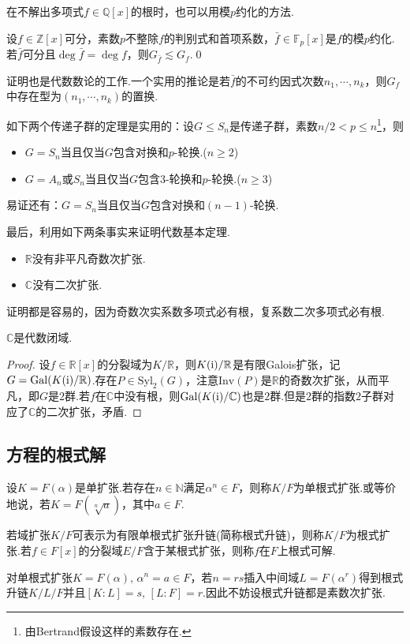 在不解出多项式$f\in\mathbb{Q}[x]$的根时，也可以用模$p$约化的方法.
\begin{thm}[(Dedekind)]
    设$f\in\mathbb{Z}[x]$可分，素数$p$不整除$f$的判别式和首项系数，$\bar f\in\mathbb{F}_p[x]$是$f$的模$p$约化.若$\bar f$可分且$\deg\bar f=\deg f$，则$G_{\bar f}\lesssim G_f$.\qed
\end{thm}
\begin{remark}
    证明也是代数数论的工作.一个实用的推论是若$\bar f$的不可约因式次数$n_1,\cdots,n_k$，则$G_f$中存在型为$(n_1,\cdots,n_k)$的置换.
\end{remark}
\begin{remark}
    如下两个传递子群的定理是实用的：设$G\le S_n$是传递子群，素数$n/2<p\le n$\footnote{由Bertrand假设这样的素数存在.}，则
    \begin{itemize}
        \item $G=S_n$当且仅当$G$包含对换和$p$-轮换.($n\ge 2$)
        \item $G=A_n$或$S_n$当且仅当$G$包含$3$-轮换和$p$-轮换.($n\ge 3$)
    \end{itemize}
    易证还有：$G=S_n$当且仅当$G$包含对换和$(n-1)$-轮换.
\end{remark}

最后，利用如下两条事实来证明代数基本定理.
\begin{itemize}
    \item $\mathbb{R}$没有非平凡奇数次扩张.
    \item $\mathbb{C}$没有二次扩张.
\end{itemize}
证明都是容易的，因为奇数次实系数多项式必有根，复系数二次多项式必有根.
\begin{thm}[(代数基本定理)]
    $\mathbb{C}$是代数闭域.
\end{thm}
\begin{proof}
    设$f\in\mathbb{R}[x]$的分裂域为$K/\mathbb{R}$，则$K(\mathrm{i})/\mathbb{R}$是有限Galois扩张，记$G=\mathrm{Gal}(K(\mathrm{i})/\mathbb{R})$.存在$P\in\mathrm{Syl}_2(G)$，注意$\mathrm{Inv}(P)$是$\mathbb{R}$的奇数次扩张，从而平凡，即$G$是$2$群.若$f$在$\mathbb{C}$中没有根，则$\mathrm{Gal}(K(\mathrm{i})/\mathbb{C})$也是$2$群.但是$2$群的指数$2$子群对应了$\mathbb{C}$的二次扩张，矛盾.
\end{proof}

\subsection{方程的根式解}
\begin{definition}
    设$K=F(\alpha)$是单扩张.若存在$n\in\mathbb{N}$满足$\alpha^n\in F$，则称$K/F$为{\heiti 单根式扩张}.或等价地说，若$K=F(\sqrt[n]{a})$，其中$a\in F$.

    若域扩张$K/F$可表示为有限单根式扩张升链(简称{\heiti 根式升链})，则称$K/F$为{\heiti 根式扩张}.若$f\in F[x]$的分裂域$E/F$含于某根式扩张，则称$f$在$F$上{\heiti 根式可解}.
\end{definition}
\begin{remark}
    对单根式扩张$K=F(\alpha),\,\alpha^n=a\in F$，若$n=rs$插入中间域$L=F(\alpha^r)$得到根式升链$K/L/F$并且$[K:L]=s,\,[L:F]=r$.因此不妨设根式升链都是素数次扩张.
\end{remark}

